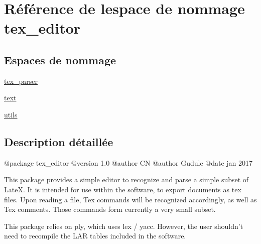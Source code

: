 \hypertarget{namespacetex__editor}{}\section{Référence de l\textquotesingle{}espace de nommage tex\+\_\+editor}
\label{namespacetex__editor}
\subsection*{Espaces de nommage}
\begin{DoxyCompactItemize}
\item 
 \hyperlink{namespacetex__editor_1_1tex__parser}{tex\+\_\+parser}
\item 
 \hyperlink{namespacetex__editor_1_1text}{text}
\item 
 \hyperlink{namespacetex__editor_1_1utils}{utils}
\end{DoxyCompactItemize}


\subsection{Description détaillée}
\begin{DoxyVerb}@package tex_editor
@version 1.0
@author CN
@author Gudule
@date jan 2017

This package provides a simple editor
 to recognize and parse a simple subset of LateX.
It is intended for use within the software, to export documents as tex files.
Upon reading a file, Tex commands will be recognized accordingly, as well
as Tex comments.
Those commands form currently a very small subset.

This package relies on ply, which uses lex / yacc. However, the user shouldn't
need to recompile the LAR tables included in the software.
\end{DoxyVerb}
 